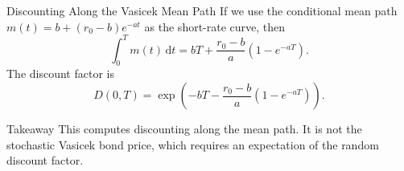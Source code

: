 \documentclass[aspectratio=169]{beamer}
\newcommand{\dd}{\,\mathrm{d}}
\begin{document}
\begin{frame}{Discounting Along the Vasicek Mean Path}
If we use the conditional mean path
$m(t)=b+(r_0-b)e^{-at}$ as the short-rate curve, then
\[
\int_0^T m(t)\dd t
=
bT+\frac{r_0-b}{a}(1-e^{-aT}).
\]
\pause
The discount factor is
\[
D(0,T)=
\exp\left(
-bT-\frac{r_0-b}{a}(1-e^{-aT})
\right).
\]
\pause
\begin{block}{Takeaway}
This computes discounting along the mean path. It is not the stochastic
Vasicek bond price, which requires an expectation of the random discount factor.
\end{block}
\end{frame}
\end{document}
